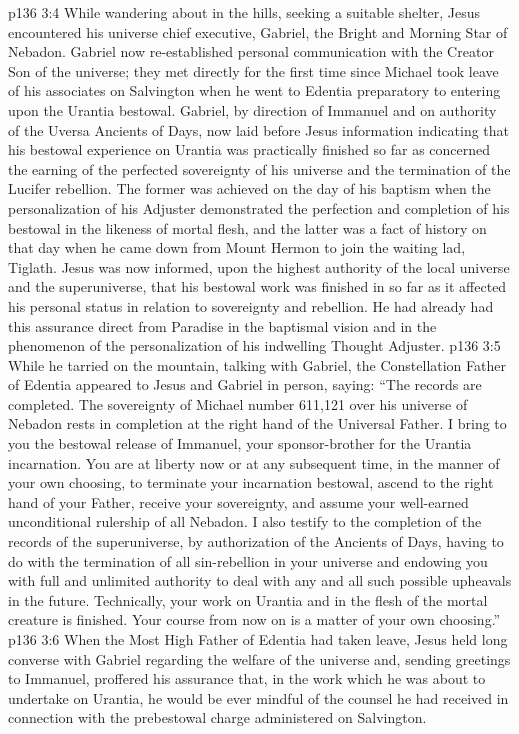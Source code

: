 \pc \vs p136 3:4 While wandering about in the hills, seeking a suitable shelter, Jesus encountered his universe chief executive, Gabriel, the Bright and Morning Star of Nebadon. Gabriel now re\hyp{}established personal communication with the Creator Son of the universe; they met directly for the first time since Michael took leave of his associates on Salvington when he went to Edentia preparatory to entering upon the Urantia bestowal. Gabriel, by direction of Immanuel and on authority of the Uversa Ancients of Days, now laid before Jesus information indicating that his bestowal experience on Urantia was practically finished so far as concerned the earning of the perfected sovereignty of his universe and the termination of the Lucifer rebellion. The former was achieved on the day of his baptism when the personalization of his Adjuster demonstrated the perfection and completion of his bestowal in the likeness of mortal flesh, and the latter was a fact of history on that day when he came down from Mount Hermon to join the waiting lad, Tiglath. Jesus was now informed, upon the highest authority of the local universe and the superuniverse, that his bestowal work was finished in so far as it affected his personal status in relation to sovereignty and rebellion. He had already had this assurance direct from Paradise in the baptismal vision and in the phenomenon of the personalization of his indwelling Thought Adjuster.
\vs p136 3:5 While he tarried on the mountain, talking with Gabriel, the Constellation Father of Edentia appeared to Jesus and Gabriel in person, saying: “The records are completed. The sovereignty of Michael number 611,121 over his universe of Nebadon rests in completion at the right hand of the Universal Father. I bring to you the bestowal release of Immanuel, your sponsor\hyp{}brother for the Urantia incarnation. You are at liberty now or at any subsequent time, in the manner of your own choosing, to terminate your incarnation bestowal, ascend to the right hand of your Father, receive your sovereignty, and assume your well\hyp{}earned unconditional rulership of all Nebadon. I also testify to the completion of the records of the superuniverse, by authorization of the Ancients of Days, having to do with the termination of all sin\hyp{}rebellion in your universe and endowing you with full and unlimited authority to deal with any and all such possible upheavals in the future. Technically, your work on Urantia and in the flesh of the mortal creature is finished. Your course from now on is a matter of your own choosing.”
\vs p136 3:6 When the Most High Father of Edentia had taken leave, Jesus held long converse with Gabriel regarding the welfare of the universe and, sending greetings to Immanuel, proffered his assurance that, in the work which he was about to undertake on Urantia, he would be ever mindful of the counsel he had received in connection with the prebestowal charge administered on Salvington.

